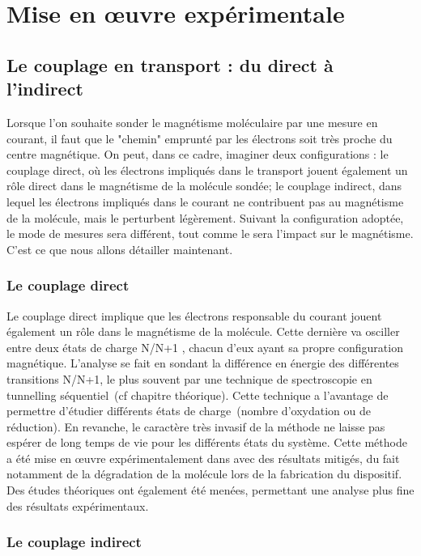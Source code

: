 \chapter{Mise en œuvre expérimentale}

\section{Le couplage en transport : du direct à l'indirect}

Lorsque l'on souhaite sonder le magnétisme moléculaire par une mesure en courant, il faut que le "chemin" emprunté par les électrons soit très proche du centre magnétique. On peut, dans ce cadre, imaginer deux configurations : le couplage direct, où les électrons impliqués dans le transport jouent également un rôle direct dans le magnétisme de la molécule sondée; le couplage indirect, dans lequel les électrons impliqués dans le courant ne contribuent pas au magnétisme de la molécule, mais le perturbent légèrement. Suivant la configuration adoptée, le mode de mesures sera différent, tout comme le sera l'impact sur le magnétisme. C'est ce que nous allons détailler maintenant.

\subsection{Le couplage direct}
Le couplage direct implique que les électrons responsable du courant jouent également un rôle dans le magnétisme de la molécule. Cette dernière va osciller entre deux états de charge N/N+1 , chacun d'eux ayant sa propre configuration magnétique. L'analyse se fait en sondant la différence en énergie des différentes transitions N/N+1, le plus souvent par une technique de spectroscopie en tunnelling séquentiel~(cf chapitre théorique). Cette technique a l'avantage de permettre d'étudier différents états de charge~(nombre d'oxydation ou de réduction). En revanche, le caractère très invasif de la méthode ne laisse pas espérer de long temps de vie pour les différents états du système. Cette méthode a été mise en œuvre expérimentalement dans \cite{Heersche2006,Jo2006,Zyazin2010} avec des résultats mitigés, du fait notamment de la dégradation de la molécule lors de la fabrication du dispositif. Des études théoriques ont également été menées\cite{Timm2006,Timm2007}, permettant une analyse plus fine des résultats expérimentaux.

\subsection{Le couplage indirect}

